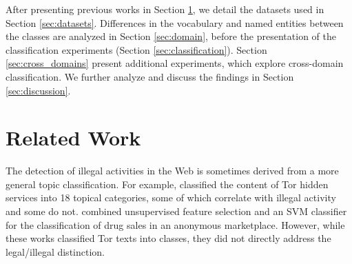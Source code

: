 \documentclass[11pt,a4paper,table]{article}
\newcommand{\oa}[1]{\footnote{\color{red}OA: #1}}
\newcommand{\es}[1]{\footnote{\color{purple}ES: #1}}
\begin{document}
  After presenting previous works in Section \ref{sec:related_work}, we detail the datasets used in Section \ref{sec:datasets}. Differences in the vocabulary and named entities between the classes are analyzed in Section \ref{sec:domain}, before the presentation of the classification experiments (Section \ref{sec:classification}). Section \ref{sec:cross_domains} present additional experiments, which explore cross-domain classification. We further analyze and discuss the findings in Section \ref{sec:discussion}.
  
  
  
	
%   
%   
%   
%
%
%
%

\section{Related Work} \label{sec:related_work}

The detection of illegal activities in the Web is sometimes derived from a more general topic classification. For example, \citet{Biryukov14}
  classified the content of Tor hidden services into 18 topical categories, some of which correlate with illegal activity and some do not.   
  \citet{GraczykKinningham15} combined unsupervised feature selection and an SVM classifier for the classification of drug sales in an anonymous marketplace.
  However, while these works classified Tor texts into classes, they did not directly address the legal/illegal distinction.
\end{document}
